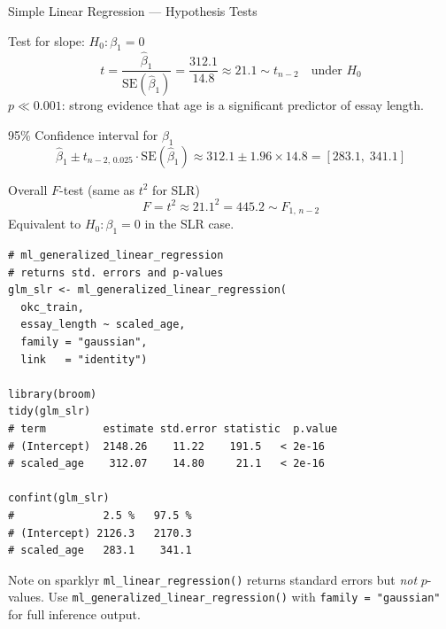 \documentclass[11pt, aspectratio=169]{beamer}
\newcommand{\Rfun}[1]{\texttt{\textcolor{codekw}{#1}}}
\begin{document}
\begin{frame}{Simple Linear Regression --- Hypothesis Tests}
	\begin{block}{Test for slope: $H_0: \beta_1 = 0$}
				\[
				t = \frac{\hat\beta_1}{\mathrm{SE}(\hat\beta_1)}
				= \frac{312.1}{14.8} \approx 21.1
				\sim t_{n-2} \quad\text{under }H_0
				\]
				$p \ll 0.001$: strong evidence that age is a significant
				predictor of essay length.
			\end{block}
			\begin{block}{95\% Confidence interval for $\beta_1$}
				\[
				\hat\beta_1 \pm t_{n-2,\,0.025}\cdot\mathrm{SE}(\hat\beta_1)
				\approx 312.1 \pm 1.96 \times 14.8
				= [283.1,\; 341.1]
				\]
			\end{block}
			\begin{block}{Overall $F$-test (same as $t^2$ for SLR)}
				\[
				F = t^2 \approx 21.1^2 = 445.2 \sim F_{1,\,n-2}
				\]
				Equivalent to $H_0: \beta_1 = 0$ in the SLR case.
			\end{block}
		\begin{lstlisting}[title={t-test via GLM (gives p-values directly)}]
# ml_generalized_linear_regression
# returns std. errors and p-values
glm_slr <- ml_generalized_linear_regression(
  okc_train,
  essay_length ~ scaled_age,
  family = "gaussian",
  link   = "identity")

library(broom)
tidy(glm_slr)
# term         estimate std.error statistic  p.value
# (Intercept)  2148.26    11.22    191.5   < 2e-16
# scaled_age    312.07    14.80     21.1   < 2e-16

confint(glm_slr)
#              2.5 %   97.5 %
# (Intercept) 2126.3   2170.3
# scaled_age   283.1    341.1
			\end{lstlisting}
			\begin{alertblock}{Note on sparklyr}
				\Rfun{ml\_linear\_regression()} returns standard errors
				but \emph{not} $p$-values.  Use
				\Rfun{ml\_generalized\_linear\_regression()} with
				\texttt{family = "gaussian"} for full inference output.
			\end{alertblock}
		\end{frame}
\end{document}
